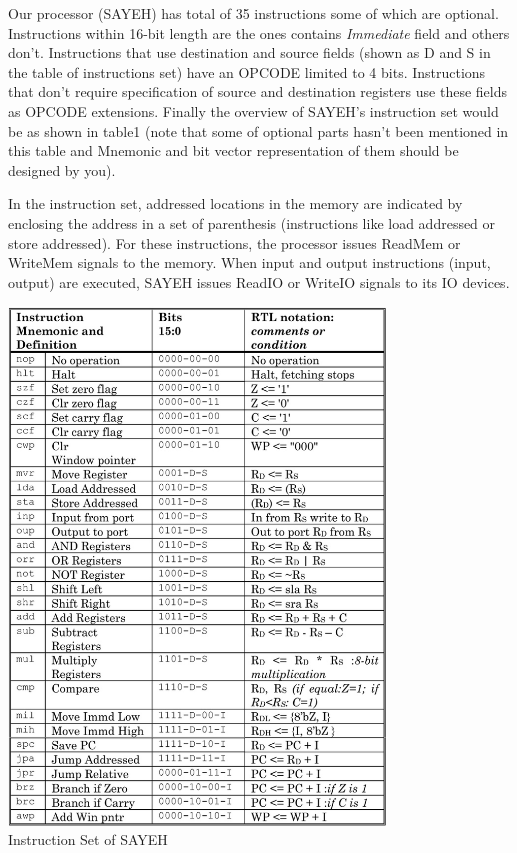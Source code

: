 \documentclass{report}
\begin{document}
    \par
        Our processor (SAYEH) has total of 35 instructions  some of which are optional. Instructions within 16-bit length are the ones contains \textit{Immediate} field and others don’t. Instructions that use destination and source fields (shown as D and S in the table of instructions set) have an OPCODE limited to 4 bits. Instructions that don’t require specification of source and destination registers use these fields as OPCODE extensions. Finally the overview of SAYEH’s instruction set would be as shown in table1 (note that some of optional parts hasn’t been mentioned in this table and Mnemonic and bit vector representation of them should be designed by you).
    \par
        In the instruction set, addressed locations in the memory are indicated by enclosing the address in a set of parenthesis (instructions like load addressed or store addressed). For these instructions, the processor issues ReadMem or WriteMem signals to the memory. When input and output instructions (input, output) are executed, SAYEH issues ReadIO or WriteIO signals to its IO devices.    

    \begin{table}[H]
        \centering
        \includegraphics[width=0.75\textwidth]{figs/table1}\\
        \caption{Instruction Set of SAYEH}
    \end{table}
\end{document}
